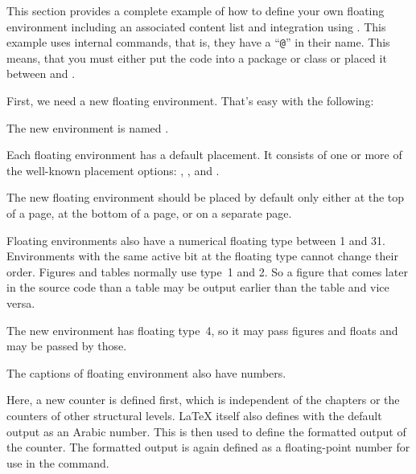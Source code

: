This section provides a complete example of how to define your own floating
environment including an associated content list and \KOMAScript{} integration
using . This example uses internal commands, that is, they
have a ``\texttt{@}'' in their name. This means, that you
must either put the code into a package or class or placed it between
%
 and .

First, we need a new floating environment.
That's easy with the following:
\begin{lstcode}
  \newenvironment{remarkbox}{%
    \@float{remarkbox}%
  }{%
    \end@float
  }
\end{lstcode}
The new environment is named .

Each floating environment has a default placement. It
consists of one or more of the well-known placement options: ,
 ,  and .
\begin{lstcode}
  \newcommand*{\fps@remarkbox}{tbp}
\end{lstcode}
The new floating environment should be placed by default only either at
the top of a page, at the bottom of a page, or on a separate page.

Floating environments also have a numerical floating
type between 1 and 31. Environments with the same active bit at the floating type cannot change
their order. Figures and tables normally use type~1 and 2. So a figure that
comes later in the source code than a table may be output earlier than the
table and vice versa.
\begin{lstcode}
  \newcommand*{\ftype@remarkbox}{4}
\end{lstcode}
The new environment has floating type~4, so it may pass figures and floats and
may be passed by those.

The captions of floating environment also have numbers.
\begin{lstcode}
  \newcommand*{\remarkboxformat}{%
    Remark~\theremarkbox\csname autodot\endcsname}
  \newcommand*{\fnum@remarkbox}{\remarkboxformat}
\end{lstcode}
Here, a new counter is defined first, which is independent of the chapters
or the counters of other structural levels. \LaTeX{} itself also defines
 with the default output as an Arabic number.
This is then used to define the formatted output of the
counter. The formatted output is again defined as a floating-point
number for use in the  command.

